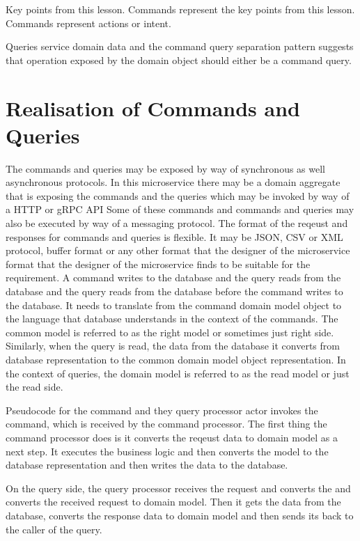 \documentclass[a4paper, 11pt]{book}
\begin{document}
    Key points from this lesson.
    Commands represent the key points from this lesson.
    Commands represent actions or intent.

    Queries service domain data and the command query separation pattern suggests that operation exposed by the domain object should either be a command query.


    \section{Realisation of Commands and Queries}

    The commands and queries may be exposed by way of synchronous as well asynchronous protocols.
    In this microservice there may be a domain aggregate that is exposing the commands and the queries which may be invoked by way of a HTTP or gRPC API
    Some of these commands and commands and queries may also be executed by way of a messaging protocol.
    The format of the reqeust and responses for commands and queries is flexible.
    It may be JSON, CSV or XML protocol, buffer format or any other format that the designer of the microservice format that the designer of the microservice finds to be suitable for the requirement.
    A command writes to the database and the query reads from the database and the query reads from the database before the command writes to the database.
    It needs to translate from the command domain model object to the language that database understands in the context of the commands.
    The common model is referred to as the right model or sometimes just right side.
    Similarly, when the query is read, the data from the database it converts from database representation to the common domain model object representation.
    In the context of queries, the domain model is referred to as the read model or just the read side.

    Pseudocode for the command and they query processor actor invokes the command, which is received by the command processor.
    The first thing the command processor does is it converts the reqeust data to domain model as a next step.
    It executes the business logic and then converts the model to the database representation and then writes the data to the database.

    On the query side, the query processor receives the request and converts the and converts the received request to domain model.
    Then it gets the data from the database, converts the response data to domain model and then sends its back to the caller of the query.
\end{document}
